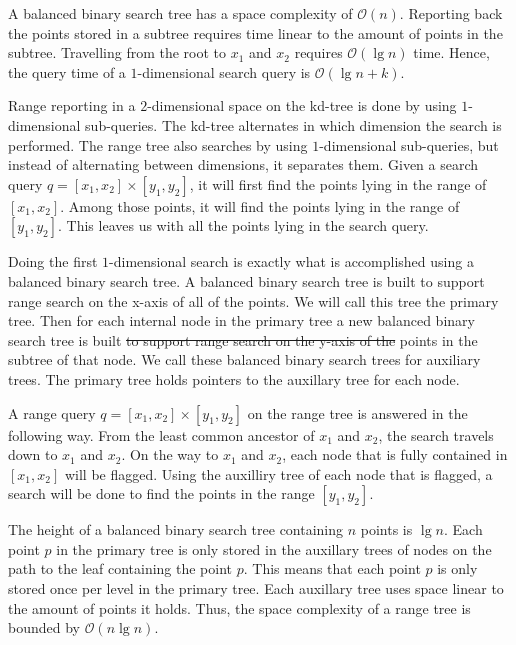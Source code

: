 \documentclass[twoside,11pt,openright]{report}
\providecommand{\DIFadd}[1]{{\protect\color{blue}\uwave{#1}}} %
\providecommand{\DIFdel}[1]{{\protect\color{red}\sout{#1}}}                      %
\providecommand{\DIFaddbegin}{} %
\providecommand{\DIFaddend}{} %
\providecommand{\DIFdelbegin}{} %
\providecommand{\DIFdelend}{} %
\begin{document}
A balanced binary search tree has a space complexity of $\mathcal{O}(n)$. Reporting back the points stored in a subtree requires time linear to the amount of points in the subtree. Travelling from the root to $x_1$ and $x_2$ requires $\mathcal{O}(\lg n)$ time. Hence, the query time of a $1$-dimensional search query is $\mathcal{O}(\lg n + k)$.

Range reporting in a $2$-dimensional space on the kd-tree is done by using $1$-dimensional sub-queries. The kd-tree alternates in which dimension the search is performed. The range tree also searches by using $1$-dimensional sub-queries, but instead of alternating between dimensions, it separates them. Given a search query $q = [x_1, x_2] \times [y_1, y_2]$, it will first find the points lying in the range of $[x_1, x_2]$. Among those points, it will find the points lying in the range of $[y_1, y_2]$. This leaves us with all the points lying in the search query.

Doing the first $1$-dimensional search is exactly what is accomplished using a balanced binary search tree. A balanced binary search tree is built to support range search on the x-axis of all of the points. We will call this tree the primary tree. Then for each internal node in the primary tree a new balanced binary search tree is built \DIFdelbegin \DIFdel{to support range search on the y-axis of the }\DIFdelend \DIFaddbegin \DIFadd{on all }\DIFaddend points in the \DIFaddbegin \DIFadd{leaves of the }\DIFaddend subtree of that node. We call these balanced binary search trees for auxiliary trees. The primary tree holds pointers to the auxillary tree for each node.

A range query $q = [x_1, x_2] \times [y_1, y_2]$ on the range tree is answered in the following way. From the least common ancestor of $x_1$ and $x_2$, the search travels down to $x_1$ and $x_2$. On the way to $x_1$ and $x_2$, each node that is fully contained in $[x_1, x_2]$ will be flagged. Using the auxilliry tree of each node that is flagged, a search will be done to find the points in the range $[y_1, y_2]$.

The height of a balanced binary search tree containing $n$ points is $\lg n$. Each point $p$ in the primary tree is only stored in the auxillary trees of nodes on the path to the leaf containing the point $p$. This means that each point $p$ is only stored once per level in the primary tree. Each auxillary tree uses space linear to the amount of points it holds. Thus, the space complexity of a range tree is bounded by $\mathcal{O}(n \lg n)$.
\end{document}
